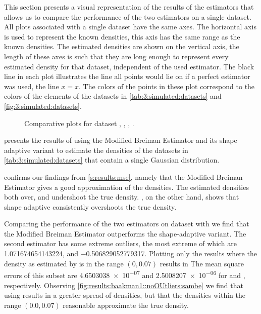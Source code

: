 This section presents a visual representation of the results of the estimators that allows us to compare the performance of the two estimators on a single dataset. All plots associated with a single dataset have the same axes. The horizontal axis is used to represent the known densities, this axis has the same range as the known densities. The estimated densities are shown on the vertical axis, the length of these axes is such that they are long enough to represent every estimated density for that dataset, independent of the used estimator. The black line in each plot illustrates the line all points would lie on if a perfect estimator was used, \ie the line $x = x$. The colors of the points in these plot correspond to the colors of the elements of the datasets in \cref{tab:3:simulated:datasets} and \cref{fig:3:simulated:datasets}.

	\begin{figure}
		\centering
		
		\caption{Comparative plots for dataset \ferdosiOne, \baakmanOne, \baakmanFour, \baakmanFive.}
		\label{fig:4:results:singleSphere}
	\end{figure}

	 presents the results of using the Modified Breiman Estimator and its shape adaptive variant to estimate the densities of the datasets in \cref{tab:3:simulated:datasets} that contain a single Gaussian distribution. 

		 confirms our findings from \cref{s:results:mse}, namely that the Modified Breiman Estimator gives a good approximation of the densities. The estimated densities both over, and undershoot the true density. , on the other hand, shows that shape adaptive \mbe consistently overshoots the true density. 

		Comparing the performance of the two estimators on dataset \numberstringnum{\baakmanOneNum} with  we find that the Modified Breiman Estimator outperforms the shape-adaptive variant. The second estimator has some extreme outliers, the most extreme of which are \num{1.071674654143224}, and \num{-0.506829052779317}. 
		Plotting only the results where the density as estimated by \sambe is in the range $\left(\num{0}, \num[round-precision=1]{0.07} \right)$ results in The mean square errors of this subset are \num{4.6503038e-07} and \num{2.5008207e-06} for \mbe and \sambe, respectively. Observing \cref{fig:results:baakman1::noOUtliers:sambe} we find that using \sambe results in a greater spread of densities, but that the densities within the range $\left(\num[round-precision=1]{0.0}, \num[round-precision=1]{0.07} \right)$ reasonable approximate the true density.

